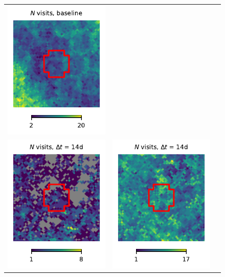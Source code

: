 \documentclass[preprintm,linenumbers]{aastex631}
\begin{document}
\begin{figure}
\begin{tabular}{  c c c}
				\includegraphics{results/skymaps_cutout/skymaps_cutout_first_year_one_snap_v4_0_10yrs_db_noDD_noTwi_nside-256_CountMetric_r_GP_noDD_noTwi.pdf} \\
				\includegraphics{results/skymaps_cutout/skymaps_cutout_first_year_one_snap_v4_0_10yrs_db_noDD_noTwi_tscale-14_nside-256_doAllTemplateMetrics_reduceCount_r_NES_noDD_noTwi.pdf} &
				\includegraphics{results/skymaps_cutout/skymaps_cutout_first_year_one_snap_v4_0_10yrs_db_noDD_noTwi_tscale-14_nside-256_doAllTemplateMetrics_reduceCount_r_WFD_noDD_noTwi.pdf} &

\end{tabular}
\end{figure}
\end{document}

